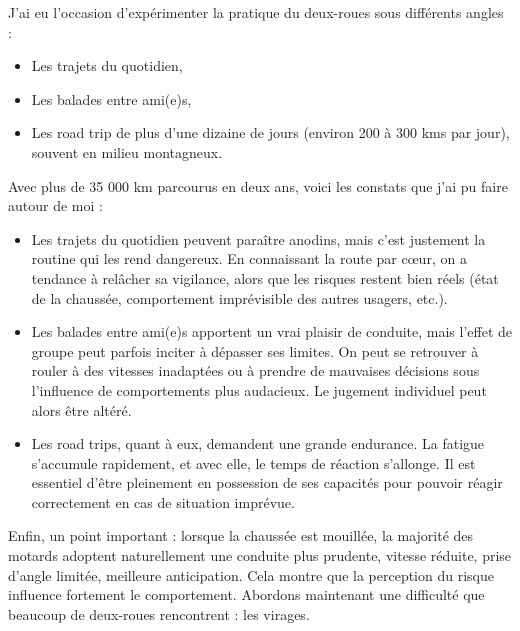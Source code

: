 J’ai eu l’occasion d’expérimenter la pratique du deux-roues sous différents angles :\
\begin{itemize}
    \item Les trajets du quotidien,
    \item Les balades entre ami(e)s,
    \item Les road trip de plus d'une dizaine de jours (environ 200 à 300 kms par jour), souvent en milieu montagneux.
\end{itemize}
Avec plus de 35 000 km parcourus en deux ans, voici les constats que j’ai pu faire autour de moi :
\begin{itemize}
  \item Les trajets du quotidien peuvent paraître anodins, mais c’est justement la routine qui les rend dangereux. En connaissant la route par cœur, on a tendance à relâcher sa vigilance, alors que les risques restent bien réels (état de la chaussée, comportement imprévisible des autres usagers, etc.).
  \item Les balades entre ami(e)s apportent un vrai plaisir de conduite, mais l’effet de groupe peut parfois inciter à dépasser ses limites. On peut se retrouver à rouler à des vitesses inadaptées ou à prendre de mauvaises décisions sous l’influence de comportements plus audacieux. Le jugement individuel peut alors être altéré.
  \item Les road trips, quant à eux, demandent une grande endurance. La fatigue s’accumule rapidement, et avec elle, le temps de réaction s’allonge. Il est essentiel d’être pleinement en possession de ses capacités pour pouvoir réagir correctement en cas de situation imprévue.
\end{itemize}
Enfin, un point important : lorsque la chaussée est mouillée, la majorité des motards adoptent naturellement une conduite plus prudente, vitesse réduite, prise d’angle limitée, meilleure anticipation. Cela montre que la perception du risque influence fortement le comportement. %
Abordons maintenant une difficulté que beaucoup de deux-roues rencontrent : les virages.

